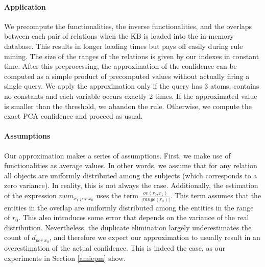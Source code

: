 {\paragraph{Application} We precompute the functionalities,
the inverse functionalities, and the overlaps between each pair of relations when the KB is loaded
into the in-memory database. This results in longer loading times but pays off easily during rule mining. The size of the ranges of the relations is given by
our indexes in constant time.
After this preprocessing, the approximation of the confidence can be computed as a simple product of precomputed values without actually firing a single query.
We apply the approximation only if the query has 3 atoms, contains no constants and each variable occurs exactly 2 times.
If the approximated value is smaller than the threshold, we abandon the rule.
Otherwise, we compute the exact PCA confidence and proceed as usual.

\paragraph{Assumptions} Our approximation makes a series of assumptions.
First, we make use of functionalities as average values. In other words, we assume that for any relation all objects are uniformly distributed among the subjects (which corresponds to a zero variance).
In reality, this is not always the case. Additionally,
the estimation of the expression $num_{x_1 \; per \; x_0}$ uses the term $\frac{ov(r_0, r_1)}{|range(r_0)|}$.
This term assumes that the entities in the overlap are uniformly distributed among the entities in the range of $r_0$. This also introduces some error that depends on the variance of the real distribution.
Nevertheless, the duplicate elimination largely underestimates the count of $d_{per\; x_0}$, and therefore we expect our approximation to usually
result in an overestimation of the actual confidence. This is indeed the case, as our experiments in Section \ref{amiepm} show.

}

